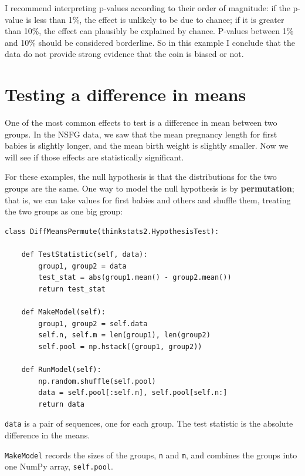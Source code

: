 \documentclass[12pt]{book}
\begin{document}
I recommend interpreting p-values according to their order of
magnitude: if the p-value is less than 1\%, the effect is unlikely to
be due to chance; if it is greater than 10\%, the effect can plausibly
be explained by chance.  P-values between 1\% and 10\% should be
considered borderline.  So in this example I conclude that the
data do not provide strong evidence that the coin is biased or not.


\section{Testing a difference in means}
\label{testdiff}

One of the most common effects to test is a difference in mean
between two groups.  In the NSFG data, we saw that the mean pregnancy
length for first babies is slightly longer, and the mean birth weight
is slightly smaller.  Now we will see if those effects are
statistically significant.

For these examples, the null hypothesis is that the distributions
for the two groups are the same.  One way to model the null
hypothesis is by {\bf permutation}; that is, we can take values
for first babies and others and shuffle them, treating
the two groups as one big group:

\begin{verbatim}
class DiffMeansPermute(thinkstats2.HypothesisTest):

    def TestStatistic(self, data):
        group1, group2 = data
        test_stat = abs(group1.mean() - group2.mean())
        return test_stat

    def MakeModel(self):
        group1, group2 = self.data
        self.n, self.m = len(group1), len(group2)
        self.pool = np.hstack((group1, group2))

    def RunModel(self):
        np.random.shuffle(self.pool)
        data = self.pool[:self.n], self.pool[self.n:]
        return data
\end{verbatim}

\verb"data" is a pair of sequences, one for each
group.  The test statistic is the absolute difference in the means.

\verb"MakeModel" records the sizes of the groups, \verb"n" and
\verb"m", and combines the groups into one NumPy
array, \verb"self.pool".
\end{document}
